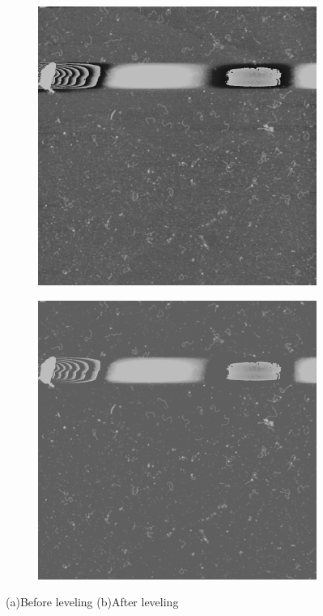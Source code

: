 \begin{figure}[!htbp]
	\begin{subfigure}{0.5\textwidth}
		\includegraphics[width=\linewidth]{noise21.png}
		\caption{}
		\label{fig:rawImage}
	\end{subfigure}%
	\hspace{\fill}
	\begin{subfigure}{0.5\textwidth}
		\includegraphics[width=\linewidth]{step21.png}
		\caption{}
		\label{fig:step1}
	\end{subfigure}%
	\caption{(a)Before leveling (b)After leveling }\label{fig:background}
\end{figure}
